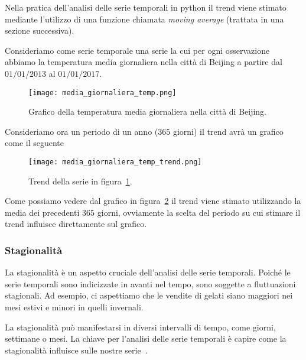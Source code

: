 Nella pratica dell'analisi delle serie temporali in python il trend viene stimato mediante 
l'utilizzo di una funzione chiamata \textit{moving average} (trattata in una sezione successiva).

\begin{esempio} 
    Consideriamo come serie temporale una serie la cui per ogni osservazione abbiamo
    la temperatura media giornaliera nella città di Beijing a partire 
    dal $01/01/2013$ al $01/01/2017$.

    \begin{figure}[H]
        \centering
        \texttt{[image: media\_giornaliera\_temp.png]}
        \caption{Grafico della temperatura media giornaliera nella città di Beijing.}
        \label{fig:media_giornaliera_temp}
    \end{figure}

    Consideriamo ora un periodo di un anno ($365$ giorni) il trend avrà un grafico
    come il seguente

    \begin{figure}[H]
        \centering
        \texttt{[image: media\_giornaliera\_temp\_trend.png]}
        \caption{Trend della serie in figura~\ref{fig:media_giornaliera_temp}.}
        \label{fig:media_giornaliera_temp_trend}
    \end{figure}

    Come possiamo vedere dal grafico in figura~\ref{fig:media_giornaliera_temp_trend} 
    il trend viene stimato utilizzando la media dei precedenti $365$ giorni, ovviamente
    la scelta del periodo su cui stimare il trend influisce direttamente sul grafico. 

\end{esempio}


\subsubsection{Stagionalità}
La stagionalità è un aspetto cruciale dell'analisi delle serie temporali. 
Poiché le serie temporali sono indicizzate in avanti nel tempo, sono soggette a 
fluttuazioni stagionali. Ad esempio, ci aspettiamo che le vendite di gelati siano 
maggiori nei mesi estivi e minori in quelli invernali.

La stagionalità può manifestarsi in diversi intervalli di tempo, 
come giorni, settimane o mesi. La chiave per l'analisi delle serie temporali 
è capire come la stagionalità influisce sulle nostre serie~\cite{md:seasonality}.

